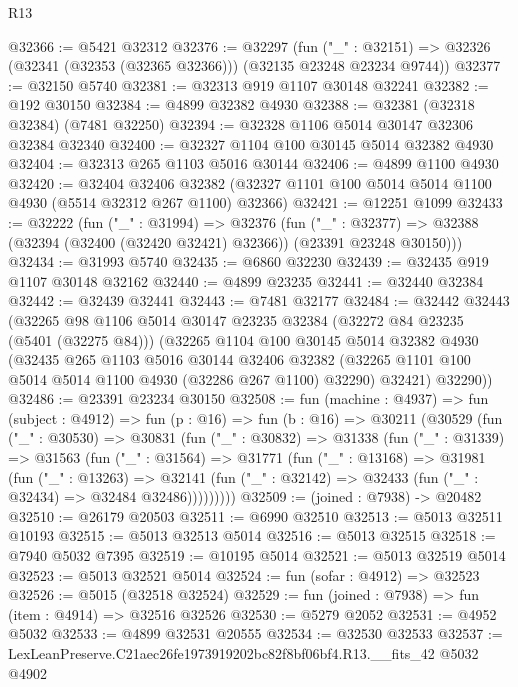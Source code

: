 \begin{lexlean}{R13}
\begin{coremodule}
@32366 := @5421 @32312
@32376 := @32297
    (fun ("_" : @32151) => @32326 (@32341 (@32353 (@32365 @32366))) (@32135 @23248 @23234 @9744))
@32377 := @32150 @5740
@32381 := @32313 @919 @1107 @30148 @32241
@32382 := @192 @30150
@32384 := @4899 @32382 @4930
@32388 := @32381 (@32318 @32384) (@7481 @32250)
@32394 := @32328 @1106 @5014 @30147 @32306 @32384 @32340
@32400 := @32327 @1104 @100 @30145 @5014 @32382 @4930
@32404 := @32313 @265 @1103 @5016 @30144
@32406 := @4899 @1100 @4930
@32420 := @32404
    @32406
    @32382
    (@32327 @1101 @100 @5014 @5014 @1100 @4930 (@5514 @32312 @267 @1100) @32366)
@32421 := @12251 @1099
@32433 := @32222
    (fun ("_" : @31994) =>
    @32376
      (fun ("_" : @32377) =>
      @32388 (@32394 (@32400 (@32420 @32421) @32366)) (@23391 @23248 @30150)))
@32434 := @31993 @5740
@32435 := @6860 @32230
@32439 := @32435 @919 @1107 @30148 @32162
@32440 := @4899 @23235
@32441 := @32440 @32384
@32442 := @32439 @32441
@32443 := @7481 @32177
@32484 := @32442
    @32443
    (@32265
      @98
      @1106
      @5014
      @30147
      @23235
      @32384
      (@32272 @84 @23235 (@5401 (@32275 @84)))
      (@32265
        @1104
        @100
        @30145
        @5014
        @32382
        @4930
        (@32435
          @265
          @1103
          @5016
          @30144
          @32406
          @32382
          (@32265 @1101 @100 @5014 @5014 @1100 @4930 (@32286 @267 @1100) @32290)
          @32421)
        @32290))
@32486 := @23391 @23234 @30150
@32508 := fun (machine : @4937) =>
  fun (subject : @4912) =>
  fun (p : @16) =>
  fun (b : @16) =>
  @30211
    (@30529
      (fun ("_" : @30530) =>
      @30831
        (fun ("_" : @30832) =>
        @31338
          (fun ("_" : @31339) =>
          @31563
            (fun ("_" : @31564) =>
            @31771
              (fun ("_" : @13168) =>
              @31981
                (fun ("_" : @13263) =>
                @32141 (fun ("_" : @32142) => @32433 (fun ("_" : @32434) => @32484 @32486)))))))))
@32509 := (joined : @7938) -> @20482
@32510 := @26179 @20503
@32511 := @6990 @32510
@32513 := @5013 @32511 @10193
@32515 := @5013 @32513 @5014
@32516 := @5013 @32515
@32518 := @7940 @5032 @7395
@32519 := @10195 @5014
@32521 := @5013 @32519 @5014
@32523 := @5013 @32521 @5014
@32524 := fun (sofar : @4912) => @32523
@32526 := @5015 (@32518 @32524)
@32529 := fun (joined : @7938) => fun (item : @4914) => @32516 @32526
@32530 := @5279 @2052
@32531 := @4952 @5032
@32533 := @4899 @32531 @20555
@32534 := @32530 @32533
@32537 := LexLeanPreserve.C21aec26fe1973919202bc82f8bf06bf4.R13.__fits_42 @5032 @4902

\end{coremodule}
\end{lexlean}
